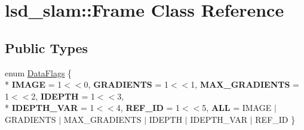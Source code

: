 \hypertarget{classlsd__slam_1_1_frame}{\section{lsd\-\_\-slam\-:\-:Frame Class Reference}
\label{classlsd__slam_1_1_frame}
}
\subsection*{Public Types}
\begin{DoxyCompactItemize}
\item 
enum \hyperlink{classlsd__slam_1_1_frame_a91c2bcdbabb5db67344b5379588e6990}{Data\-Flags} \{ \\*
{\bfseries I\-M\-A\-G\-E} = 1$<$$<$0, 
{\bfseries G\-R\-A\-D\-I\-E\-N\-T\-S} = 1$<$$<$1, 
{\bfseries M\-A\-X\-\_\-\-G\-R\-A\-D\-I\-E\-N\-T\-S} = 1$<$$<$2, 
{\bfseries I\-D\-E\-P\-T\-H} = 1$<$$<$3, 
\\*
{\bfseries I\-D\-E\-P\-T\-H\-\_\-\-V\-A\-R} = 1$<$$<$4, 
{\bfseries R\-E\-F\-\_\-\-I\-D} = 1$<$$<$5, 
{\bfseries A\-L\-L} = I\-M\-A\-G\-E $\vert$ G\-R\-A\-D\-I\-E\-N\-T\-S $\vert$ M\-A\-X\-\_\-\-G\-R\-A\-D\-I\-E\-N\-T\-S $\vert$ I\-D\-E\-P\-T\-H $\vert$ I\-D\-E\-P\-T\-H\-\_\-\-V\-A\-R $\vert$ R\-E\-F\-\_\-\-I\-D
 \}
\end{DoxyCompactItemize}
